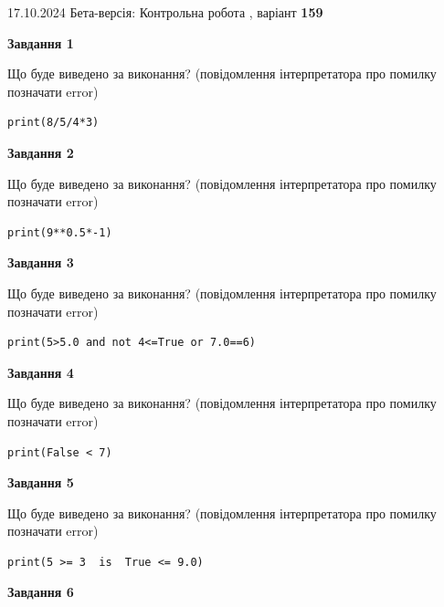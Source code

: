 \documentclass[12pt, ukrainian]{article}
\begin{document}
{\Large{17.10.2024 Бета-версія: Контрольна робота , варіант  \No \textbf { 159 }\par}}
{
\begin {large}
{\begin {center}\textbf{Завдання 1}\end {center}}

Що буде виведено за виконання? (повідомлення інтерпретатора про помилку позначати error)\par
\begin{verbatim}
print(8/5/4*3)
\end{verbatim}

{\begin {center}\textbf{Завдання 2}\end {center}}

Що буде виведено за виконання? (повідомлення інтерпретатора про помилку позначати error)\par
\begin{verbatim}
print(9**0.5*-1)
\end{verbatim}

{\begin {center}\textbf{Завдання 3}\end {center}}

Що буде виведено за виконання? (повідомлення інтерпретатора про помилку позначати error)\par
\begin{verbatim}
print(5>5.0 and not 4<=True or 7.0==6)
\end{verbatim}

{\begin {center}\textbf{Завдання 4}\end {center}}

Що буде виведено за виконання? (повідомлення інтерпретатора про помилку позначати error)\par
\begin{verbatim}
print(False < 7)
\end{verbatim}

{\begin {center}\textbf{Завдання 5}\end {center}}

Що буде виведено за виконання? (повідомлення інтерпретатора про помилку позначати error)\par
\begin{verbatim}
print(5 >= 3  is  True <= 9.0)
\end{verbatim}

{\begin {center}\textbf{Завдання 6}\end {center}}


\end{large}}
\end{document}

